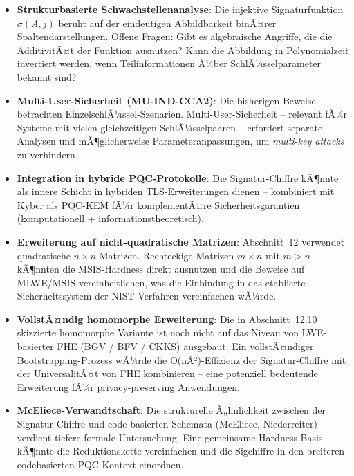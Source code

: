 ﻿\documentclass[a4paper,12pt]{article}
\theoremstyle{definition}
\begin{document}
\begin{itemize}
  \item \textbf{Strukturbasierte Schwachstellenanalyse}:
    Die injektive Signaturfunktion $\sigma(A,j)$ beruht auf der
    eindeutigen Abbildbarkeit binÃ¤rer Spaltendarstellungen.
    Offene Fragen: Gibt es algebraische Angriffe, die die
    AdditivitÃ¤t der Funktion ausnutzen? Kann die Abbildung in
    Polynomialzeit invertiert werden, wenn Teilinformationen
    Ã¼ber SchlÃ¼sselparameter bekannt sind?
  \item \textbf{Multi-User-Sicherheit (MU-IND-CCA2)}:
    Die bisherigen Beweise betrachten EinzelschlÃ¼ssel-Szenarien.
    Multi-User-Sicherheit -- relevant fÃ¼r Systeme mit vielen
    gleichzeitigen SchlÃ¼sselpaaren -- erfordert separate Analysen
    und mÃ¶glicherweise Parameteranpassungen, um \emph{multi-key attacks}
    zu verhindern.
  \item \textbf{Integration in hybride PQC-Protokolle}:
    Die Signatur-Chiffre kÃ¶nnte als innere Schicht in hybriden
    TLS-Erweiterungen dienen -- kombiniert mit Kyber als PQC-KEM
    fÃ¼r komplementÃ¤re Sicherheitsgarantien
    (komputationell + informationstheoretisch).
  \item \textbf{Erweiterung auf nicht-quadratische Matrizen}:
    Abschnitt~12 verwendet quadratische $n \times n$-Matrizen.
    Rechteckige Matrizen $m \times n$ mit $m > n$ kÃ¶nnten die
    MSIS-Hardness direkt ausnutzen und die Beweise auf MLWE/MSIS
    vereinheitlichen, was die Einbindung in das etablierte
    Sicherheitssystem der NIST-Verfahren vereinfachen wÃ¼rde.
  \item \textbf{VollstÃ¤ndig homomorphe Erweiterung}:
    Die in Abschnitt~12.10 skizzierte homomorphe Variante
    ist noch nicht auf das Niveau von LWE-basierter FHE
    (BGV / BFV / CKKS) ausgebaut. Ein vollstÃ¤ndiger Bootstrapping-Prozess
    wÃ¼rde die O(nÂ²)-Effizienz der Signatur-Chiffre
    mit der UniversalitÃ¤t von FHE kombinieren -- eine
    potenziell bedeutende Erweiterung fÃ¼r privacy-preserving
    Anwendungen.
  \item \textbf{McEliece-Verwandtschaft}:
    Die strukturelle Ã„hnlichkeit zwischen der Signatur-Chiffre
    und code-basierten Schemata (McEliece, Niederreiter) verdient
    tiefere formale Untersuchung. Eine gemeinsame Hardness-Basis
    kÃ¶nnte die Reduktionskette vereinfachen und die Sigchiffre in
    den breiteren codebasierten PQC-Kontext einordnen.
\end{itemize}

\end{document}
